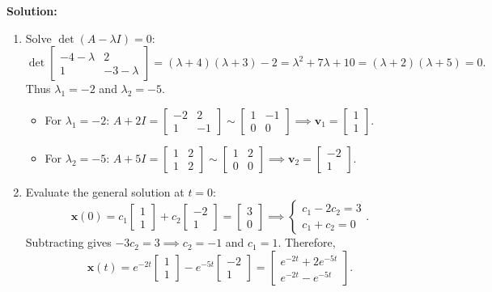 \documentclass[11pt, letterpaper]{article}
\theoremstyle{definition}
\theoremstyle{remark}
\begin{document}
\textbf{Solution:}
\begin{enumerate}[label=(\alph*)]
    \item Solve $\det(A - \lambda I) = 0$:
    \[
    \det \begin{bmatrix} -4 - \lambda & 2 \\ 1 & -3 - \lambda \end{bmatrix} = (\lambda + 4)(\lambda + 3) - 2 = \lambda^2 + 7\lambda + 10 = (\lambda + 2)(\lambda + 5) = 0.
    \]
    Thus $\lambda_1 = -2$ and $\lambda_2 = -5$.
    \begin{itemize}
        \item For $\lambda_1 = -2$: $A + 2I = \begin{bmatrix} -2 & 2 \\ 1 & -1 \end{bmatrix} \sim \begin{bmatrix} 1 & -1 \\ 0 & 0 \end{bmatrix} \implies \mathbf{v}_1 = \begin{bmatrix} 1 \\ 1 \end{bmatrix}$.
        \item For $\lambda_2 = -5$: $A + 5I = \begin{bmatrix} 1 & 2 \\ 1 & 2 \end{bmatrix} \sim \begin{bmatrix} 1 & 2 \\ 0 & 0 \end{bmatrix} \implies \mathbf{v}_2 = \begin{bmatrix} -2 \\ 1 \end{bmatrix}$.
    \end{itemize}

    \item Evaluate the general solution at $t = 0$:
    \[
    \mathbf{x}(0) = c_1 \begin{bmatrix} 1 \\ 1 \end{bmatrix} + c_2 \begin{bmatrix} -2 \\ 1 \end{bmatrix} = \begin{bmatrix} 3 \\ 0 \end{bmatrix} \implies \begin{cases} c_1 - 2c_2 = 3 \\ c_1 + c_2 = 0 \end{cases}.
    \]
    Subtracting gives $-3c_2 = 3 \implies c_2 = -1$ and $c_1 = 1$. Therefore,
    \[
    \mathbf{x}(t) = e^{-2t}\begin{bmatrix} 1 \\ 1 \end{bmatrix} - e^{-5t}\begin{bmatrix} -2 \\ 1 \end{bmatrix} = \begin{bmatrix} e^{-2t} + 2e^{-5t} \\ e^{-2t} - e^{-5t} \end{bmatrix}.
    \]


\end{enumerate}
\end{document}
